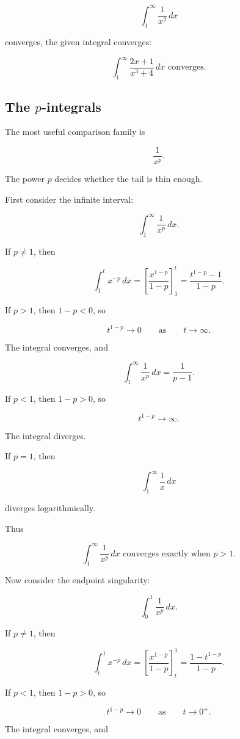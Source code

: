 \[
\int_1^\infty \frac1{x^2}\,dx
\]

converges, the given integral converges:

\[
\boxed{
\int_1^\infty \frac{2x+1}{x^3+4}\,dx
\text{ converges.}
}
\]

\subsection{The \texorpdfstring{\(p\)-integrals}{p-integrals}}
\label{subsec:p-integrals}

The most useful comparison family is

\[
\frac1{x^p}.
\]

The power \(p\) decides whether the tail is thin enough.

First consider the infinite interval:

\[
\int_1^\infty \frac1{x^p}\,dx.
\]

If \(p\neq1\), then

\[
\int_1^t x^{-p}\,dx
=
\left[\frac{x^{1-p}}{1-p}\right]_1^t
=
\frac{t^{1-p}-1}{1-p}.
\]

If \(p>1\), then \(1-p<0\), so

\[
t^{1-p}\to0
\qquad\text{as}\qquad
t\to\infty.
\]

The integral converges, and

\[
\int_1^\infty \frac1{x^p}\,dx
=
\frac1{p-1}.
\]

If \(p<1\), then \(1-p>0\), so

\[
t^{1-p}\to\infty.
\]

The integral diverges.

If \(p=1\), then

\[
\int_1^\infty \frac1x\,dx
\]

diverges logarithmically.

Thus

\[
\boxed{
\int_1^\infty \frac1{x^p}\,dx
\text{ converges exactly when } p>1.
}
\]

Now consider the endpoint singularity:

\[
\int_0^1 \frac1{x^p}\,dx.
\]

If \(p\neq1\), then

\[
\int_t^1 x^{-p}\,dx
=
\left[\frac{x^{1-p}}{1-p}\right]_t^1
=
\frac{1-t^{1-p}}{1-p}.
\]

If \(p<1\), then \(1-p>0\), so

\[
t^{1-p}\to0
\qquad\text{as}\qquad
t\to0^+.
\]

The integral converges, and

